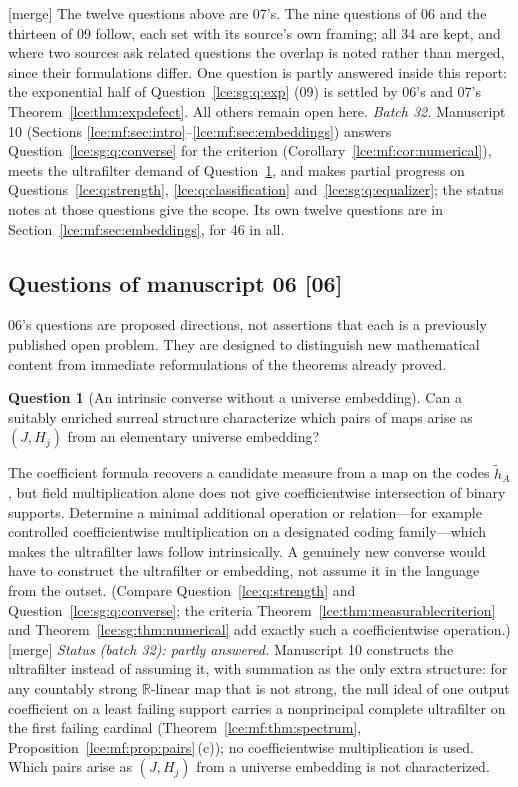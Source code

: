 \documentclass[11pt,letterpaper]{article}
\numberwithin{equation}{section}
\theoremstyle{definition}
\newtheorem{question}[theorem]{Question}
\theoremstyle{remark}
\newcommand{\R}{\mathbb R}
\newcommand{\thref}[1]{Theorem~\ref{#1}}
\newcommand{\prref}[1]{Proposition~\ref{#1}}
\newcommand{\src}[1]{\textup{\textsf{\small[#1]}}}%
\newcommand{\mergetag}{\textup{\textsf{\small[merge]}}}%
\begin{document}
\mergetag{} The twelve questions above are 07's. The nine questions of 06
and the thirteen of 09 follow, each set with its source's own framing; all
34 are kept, and where two sources ask related questions the overlap is
noted rather than merged, since their formulations differ. One question is
partly answered inside this report: the exponential half of
Question~\ref{lce:sg:q:exp} (09) is settled by 06's and 07's
\thref{lce:thm:expdefect}. All others remain open here.
\emph{Batch 32.} Manuscript 10 (Sections
\ref{lce:mf:sec:intro}--\ref{lce:mf:sec:embeddings}) answers
Question~\ref{lce:sg:q:converse} for the criterion
(Corollary~\ref{lce:mf:cor:numerical}), meets the ultrafilter demand of
Question~\ref{lce:cs:q:converse}, and makes partial progress on
Questions~\ref{lce:q:strength}, \ref{lce:q:classification}
and~\ref{lce:sg:q:equalizer}; the status notes at those questions give the
scope. Its own twelve questions are in Section~\ref{lce:mf:sec:embeddings},
for 46 in all.

\subsection{Questions of manuscript 06 \src{06}}
06's questions are proposed directions, not assertions that each is a
previously published open problem. They are designed to distinguish new
mathematical content from immediate reformulations of the theorems already
proved.

\begin{question}[An intrinsic converse without a universe embedding]\label{lce:cs:q:converse}
Can a suitably enriched surreal structure characterize which pairs of maps
arise as $(J,H_j)$ from an elementary universe embedding?
\end{question}
The coefficient formula recovers a candidate measure from a map on the codes
$\tilde h_A$, but field multiplication alone does not give coefficientwise
intersection of binary supports. Determine a minimal additional operation or
relation---for example controlled coefficientwise multiplication on a
designated coding family---which makes the ultrafilter laws follow
intrinsically. A genuinely new converse would have to construct the
ultrafilter or embedding, not assume it in the language from the outset.
(Compare Question~\ref{lce:q:strength} and Question~\ref{lce:sg:q:converse};
the criteria \thref{lce:thm:measurablecriterion} and
\thref{lce:sg:thm:numerical} add exactly such a coefficientwise operation.)
\mergetag{} \emph{Status (batch 32): partly answered.} Manuscript 10
constructs the ultrafilter instead of assuming it, with summation as the
only extra structure: for any countably strong $\R$-linear map that is not
strong, the null ideal of one output coefficient on a least failing support
carries a nonprincipal complete ultrafilter on the first failing cardinal
(\thref{lce:mf:thm:spectrum}, \prref{lce:mf:prop:pairs}\,(c)); no
coefficientwise multiplication is used. Which pairs arise as $(J,H_j)$ from
a universe embedding is not characterized.
\end{document}
